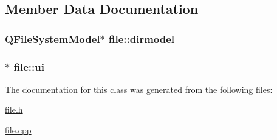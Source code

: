 \subsection{Member Data Documentation}
\hypertarget{classfile_a86cd6a7325c283ae13313938ce896442}{
\subsubsection[{dirmodel}]{\setlength{\rightskip}{0pt plus 5cm}Q\-File\-System\-Model$\ast$ file\-::dirmodel\hspace{0.3cm}{\ttfamily [private]}}}\label{classfile_a86cd6a7325c283ae13313938ce896442}
\hypertarget{classfile_a54156dd94ca0eb23b6465cbfc8e23b3e}{
\subsubsection[{ui}]{$\ast$ file\-::ui\hspace{0.3cm}{\ttfamily [private]}}}\label{classfile_a54156dd94ca0eb23b6465cbfc8e23b3e}


The documentation for this class was generated from the following files\-:\begin{DoxyCompactItemize}
\item 
\hyperlink{file_8h}{file.\-h}\item 
\hyperlink{file_8cpp}{file.\-cpp}\end{DoxyCompactItemize}

